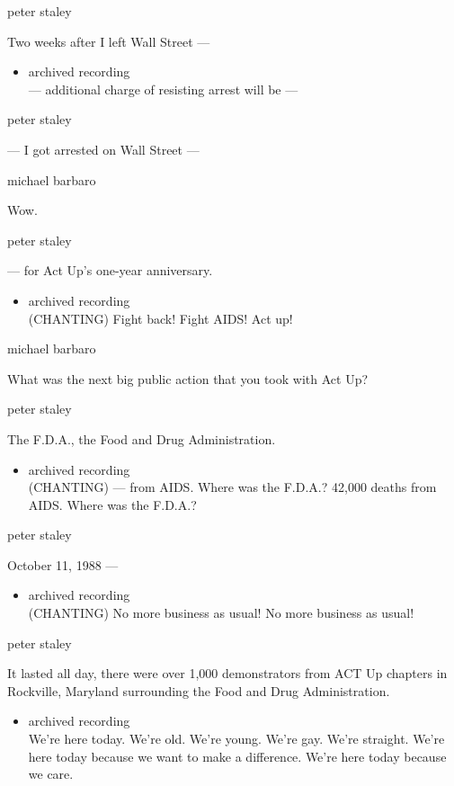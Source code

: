 peter staley

Two weeks after I left Wall Street ---

\begin{itemize}
\tightlist
\item
  archived recording\\
  --- additional charge of resisting arrest will be ---
\end{itemize}

peter staley

--- I got arrested on Wall Street ---

michael barbaro

Wow.

peter staley

--- for Act Up's one-year anniversary.

\begin{itemize}
\tightlist
\item
  archived recording\\
  (CHANTING) Fight back! Fight AIDS! Act up!
\end{itemize}

michael barbaro

What was the next big public action that you took with Act Up?

peter staley

The F.D.A., the Food and Drug Administration.

\begin{itemize}
\tightlist
\item
  archived recording\\
  (CHANTING) --- from AIDS. Where was the F.D.A.? 42,000 deaths from
  AIDS. Where was the F.D.A.?
\end{itemize}

peter staley

October 11, 1988 ---

\begin{itemize}
\tightlist
\item
  archived recording\\
  (CHANTING) No more business as usual! No more business as usual!
\end{itemize}

peter staley

It lasted all day, there were over 1,000 demonstrators from ACT Up
chapters in Rockville, Maryland surrounding the Food and Drug
Administration.

\begin{itemize}
\tightlist
\item
  archived recording\\
  We're here today. We're old. We're young. We're gay. We're straight.
  We're here today because we want to make a difference. We're here
  today because we care.
\end{itemize}

